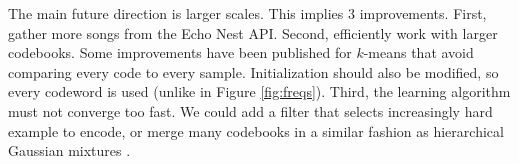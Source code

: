 \documentclass{article}
\begin{document}
The main future direction is larger scales. This implies $3$ improvements.
First, gather more songs from the Echo Nest API. Second, efficiently work
with larger codebooks. Some improvements have been published for $k$-means
that avoid comparing every code to every sample. Initialization
should also be modified, so every codeword is used (unlike in
Figure \ref{fig:freqs}). Third, the learning
algorithm must not converge too fast. We could add a filter that selects
increasingly hard example to encode, or merge many codebooks in a similar
fashion as hierarchical Gaussian mixtures \cite{Vasconcelos2001}.




\small



\end{document}
